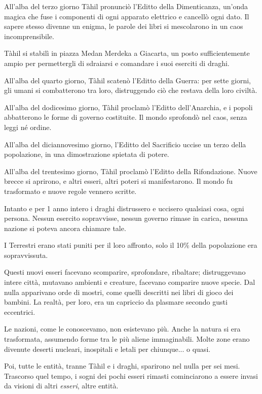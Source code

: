 \begin{multicols}{2}
All'alba del terzo giorno Tàhil pronunciò l'Editto della Dimenticanza, un'onda magica che fuse i componenti di ogni apparato elettrico e cancellò ogni dato. Il sapere stesso divenne un enigma, le parole dei libri si mescolarono in un caos incomprensibile.

Tàhil si stabilì in piazza Medan Merdeka a Giacarta, un posto sufficientemente ampio per permettergli di sdraiarsi e comandare i suoi eserciti di draghi.

All’alba del quarto giorno, Tàhil scatenò l’Editto della Guerra: per sette giorni, gli umani si combatterono tra loro, distruggendo ciò che restava della loro civiltà.

All’alba del dodicesimo giorno, Tàhil proclamò l’Editto dell’Anarchia, e i popoli abbatterono le forme di governo costituite. Il mondo sprofondò nel caos, senza leggi né ordine.

All’alba del diciannovesimo giorno, l’Editto del Sacrificio uccise un terzo della popolazione, in una dimostrazione spietata di potere.

All’alba del trentesimo giorno, Tàhil proclamò l’Editto della Rifondazione. Nuove brecce si aprirono, e altri esseri, altri poteri si manifestarono. Il mondo fu trasformato e nuove regole vennero scritte.

Intanto e per 1 anno intero i draghi distrussero e uccisero qualsiasi cosa, ogni persona. Nessun esercito sopravvisse, nessun governo rimase in carica, nessuna nazione si poteva ancora chiamare tale.

I Terrestri erano stati puniti per il loro affronto, solo il 10\% della popolazione era sopravvissuta.

Questi nuovi esseri facevano scomparire, sprofondare, ribaltare; distruggevano intere città, mutavano ambienti e creature, facevano comparire nuove specie. Dal nulla apparivano orde di mostri, come quelli descritti nei libri di gioco dei bambini. La realtà, per loro, era un capriccio da plasmare secondo gusti eccentrici.

Le nazioni, come le conoscevamo, non esistevano più. Anche la natura si era trasformata, assumendo forme tra le più aliene immaginabili. Molte zone erano divenute deserti nucleari, inospitali e letali per chiunque... o quasi.

Poi, tutte le entità, tranne Tàhil e i draghi, sparirono nel nulla per sei mesi.
Trascorso quel tempo, i sogni dei pochi esseri rimasti cominciarono a essere invasi da visioni di altri \emph{esseri}, altre entità.


\end{multicols}
